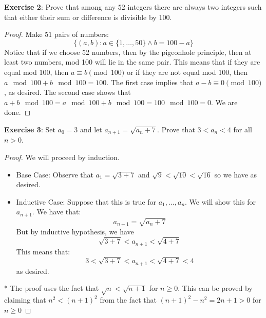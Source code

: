 \documentclass{article}
\begin{document}
\textbf{Exercise 2}: Prove that among any $52$ integers there are always two integers such that either their sum or difference is divisible by 100.
    \begin{proof}
        Make $51$ pairs of numbers:
            \begin{equation*}
                \{(a, b): a \in \{1, \ldots, 50\} \land b = 100 - a\}
            \end{equation*}
        Notice that if we choose 52 numbers, then by the pigeonhole principle, then at least two numbers, mod 100 will lie in the same pair. This means that if they are equal mod 100, then $a \equiv b \pmod{100}$ or if they are not equal mod 100, then $a \mod{100} + b \mod{100} = 100$. The first case implies that $a - b \equiv 0 \pmod{100}$, as desired. The second case shows that $a + b \mod{100} = a \mod{100} + b \mod{100} = 100 \mod{100} = 0$. We are done.
    \end{proof}

\textbf{Exercise 3}: Set $a_{0} = 3$ and let $a_{n + 1} = \sqrt{a_{n} + 7}$. Prove that $3 < a_{n} < 4$ for all $n > 0$.
    \begin{proof}
        We will proceed by induction. 
            \begin{itemize}
                \item Base Case: Observe that $a_{1} = \sqrt{3 + 7}$ and $\sqrt{9} <  \sqrt{10} < \sqrt{16}$ so we have as desired.

                \item Inductive Case: Suppose that this is true for $a_{1}, \ldots, a_{n}$. We will show this for $a_{n + 1}$. We have that:
                    \begin{equation*}
                        a_{n + 1} = \sqrt{a_{n} + 7}
                    \end{equation*}
                But by inductive hypothesis, we have 
                    \begin{equation*}
                        \sqrt{3 + 7} < a_{n + 1} < \sqrt{4 + 7}
                    \end{equation*}
                This means that:
                    \begin{equation*}
                        3 <  \sqrt{3 + 7} < a_{n + 1} <  \sqrt{4 + 7} <  4
                    \end{equation*}
                as desired.
            \end{itemize}
        * The proof uses the fact that $\sqrt{n} <  \sqrt{n + 1}$ for $n \geq 0$. This can be proved by claiming that $n^{2} < (n + 1)^{2}$ from the fact that $(n + 1)^{2} - n^{2} = 2n + 1 >  0$ for $n \geq  0$
    \end{proof}
\end{document}
